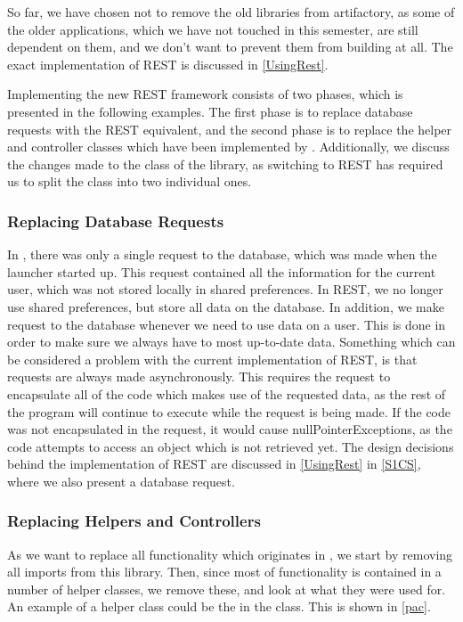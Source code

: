 So far, we have chosen not to remove the old libraries from artifactory, as some
of the older applications, which we have not touched in this semester, are still
dependent on them, and we don't want to prevent them from building at all. The
exact implementation of REST is discussed in \autoref{UsingRest}.\nl

Implementing the new REST framework consists of two phases, which is presented
in the following examples. The first phase is to replace database requests with the
REST equivalent, and the second phase is to replace the helper and controller
classes which have been implemented by . Additionally, we discuss
the changes made to the  class of the
 library, as switching to REST has required us to split the
class into two individual ones.

\subsubsection{Replacing Database Requests}
In , there was only a single request to the database, which was
made when the launcher started up. This request contained all the information
for the current user, which was not stored locally in shared preferences. In
REST, we no longer use shared preferences, but store all data on the database.
In addition, we make request to the database whenever we need to use data on a
user. This is done in order to make sure we always have to most up-to-date data.
Something which can be considered a problem with the current implementation of
REST, is that requests are always made asynchronously.
This requires the request to encapsulate all of the code which makes use of the
requested data, as the rest of the program will continue to execute while the
request is being made. If the code was not encapsulated in the request, it would
cause nullPointerExceptions, as the code attempts to access an object which is
not retrieved yet. The design decisions behind the implementation of REST are
discussed in \autoref{UsingRest} in \autoref{S1CS}, where we also present a
database request.

\subsubsection{Replacing Helpers and Controllers}
As we want to replace all functionality which originates
in , we start by removing all imports from this library. Then,
since most of  functionality is contained in a number of helper
classes, we remove these, and look at what they were used for. An example of a
helper class could be the  in the
 class. This is shown in \autoref{pac}.\nl

